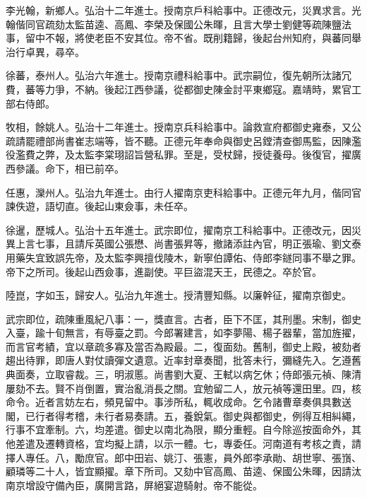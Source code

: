 \begin{pinyinscope}
李光翰，新鄉人。弘治十二年進士。授南京戶科給事中。正德改元，災異求言。光翰偕同官疏劾太監苗逵、高鳳、李榮及保國公朱暉，且言大學士劉健等疏陳鹽法事，留中不報，將使老臣不安其位。帝不省。既削籍歸，後起台州知府，與蕃同舉治行卓異，尋卒。

徐蕃，泰州人。弘治六年進士。授南京禮科給事中。武宗嗣位，復先朝所汰諸冗費，蕃等力爭，不納。後起江西參議，從都御史陳金討平東鄉寇。嘉靖時，累官工部右侍郎。

牧相，餘姚人。弘治十二年進士。授南京兵科給事中。論救宣府都御史雍泰，又公疏請罷禮部尚書崔志端等，皆不聽。正德元年奉命與御史呂鏜清查御馬監，因陳濫役濫費之弊，及太監李棠珝詔旨營私罪。至是，受杖歸，授徒養母。後復官，擢廣西參議。命下，相已前卒。

任惠，灤州人。弘治九年進士。由行人擢南京吏科給事中。正德元年九月，偕同官諫佚遊，語切直。後起山東僉事，未任卒。

徐暹，歷城人。弘治十五年進士。武宗即位，擢南京工科給事中。正德改元，因災異上言七事，且請斥英國公張懋、尚書張昇等，撤諸添註內官，明正張瑜、劉文泰用藥失宜致誤先帝，及太監李興擅伐陵木，新寧伯譚佑、侍郎李鐩同事不舉之罪。帝下之所司。後起山西僉事，進副使。平巨盜混天王，民德之。卒於官。

陸崑，字如玉，歸安人。弘治九年進士。授清豐知縣。以廉幹征，擢南京御史。

武宗即位，疏陳重風紀八事：一，獎直言。古者，臣下不匡，其刑墨。宋制，御史入臺，踰十旬無言，有辱臺之罰。今郎署建言，如李夢陽、楊子器輩，當加旌擢，而言官考績，宜以章疏多寡及當否為殿最。二，復面劾。舊制，御史上殿，被劾者趨出待罪，即唐人對仗讀彈文遺意。近率封章奏聞，批答未行，彌縫先入。乞遵舊典面奏，立取睿裁。三，明淑慝。尚書劉大夏、王軾以病乞休；侍郎張元禎、陳清屢劾不去。賢不肖倒置，實治亂消長之關。宜勉留二人，放元禎等還田里。四，核命令。近者言妨左右，頻見留中。事涉所私，輒收成命。乞令諸曹章奏俱具數送閣，已行者得考稽，未行者易奏請。五，養銳氣。御史與都御史，例得互相糾繩，行事不宜牽制。六，均差遣。御史以南北為限，顯分重輕。自今除巡按面命外，其他差遣及遷轉資格，宜均擬上請，以示一體。七，專委任。河南道有考核之責，請擇人專任。八，勵庶官。郎中田岩、姚汀、張憲，員外郎李承勛、胡世寧、張嵿、顧璘等二十人，皆宜顯擢。章下所司。又劾中官高鳳、苗逵、保國公朱暉，因請汰南京增設守備內臣，廣開言路，屏絕宴遊騎射。帝不能從。


\end{pinyinscope}
